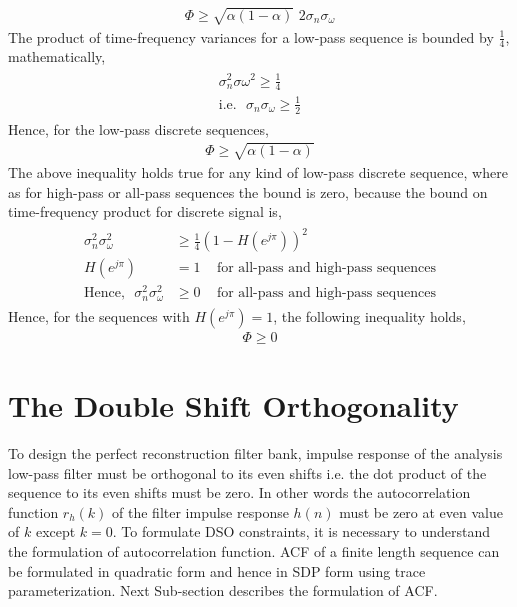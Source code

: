 \begin{eqnarray}
\Phi \geq \sqrt{\alpha(1-\alpha)}\,\,2 \sigma_n \sigma_\omega
\end{eqnarray}
The product of time-frequency variances for a low-pass sequence is bounded by $\frac{1}{4}$, mathematically,
\begin{eqnarray}
\begin{aligned}
\sigma_n^2 \sigma\omega^2 \geq \frac{1}{4}\\
\text{i.e.} \,\,\,\, \sigma_n \sigma_\omega \geq \frac{1}{2}
\end{aligned}
\end{eqnarray}
Hence, for the low-pass discrete sequences,
\begin{eqnarray}
\label{eq: CCTFV Bound LP}
\Phi \geq \sqrt{\alpha(1-\alpha)}
\end{eqnarray}
The above inequality holds true for any kind of low-pass discrete sequence, where as for high-pass or all-pass sequences the bound is zero, because the bound on time-frequency product for discrete signal is,
\begin{eqnarray}
\begin{aligned}
\sigma_n^2 \sigma_\omega^2 &\geq \frac{1}{4} (1 - H(e^{j\pi}))^2 \\
H(e^{j\pi}) &= 1 \,\,\,\,\,\,\, \text{for all-pass and high-pass sequences} \\
\text{Hence,}\,\,\,\,
\sigma_n^2 \sigma_\omega^2 &\geq 0 \,\,\,\,\,\,\, \text{for all-pass and high-pass sequences} 
\end{aligned}
\end{eqnarray}
Hence, for the sequences with $H(e^{j\pi}) = 1$, the following inequality holds,
\begin{eqnarray}
\label{eq: CCTFV Bound HP}
\Phi \geq 0
\end{eqnarray}
\section{The Double Shift Orthogonality}
\label{sec: The Double Shift Orthogonality}
To design the perfect reconstruction filter bank, impulse response of the analysis low-pass filter  must be orthogonal to its even shifts i.e. the dot product of the sequence to its even shifts must be zero. In other words the autocorrelation function $r_h(k)$ of the filter impulse response $h(n)$ must be zero at even value of $k$ except $k=0$.
To formulate DSO constraints, it is necessary to understand the formulation of autocorrelation function. ACF of a finite length sequence can be formulated in quadratic form and hence in SDP form using trace parameterization. Next Sub-section describes the formulation of ACF.
